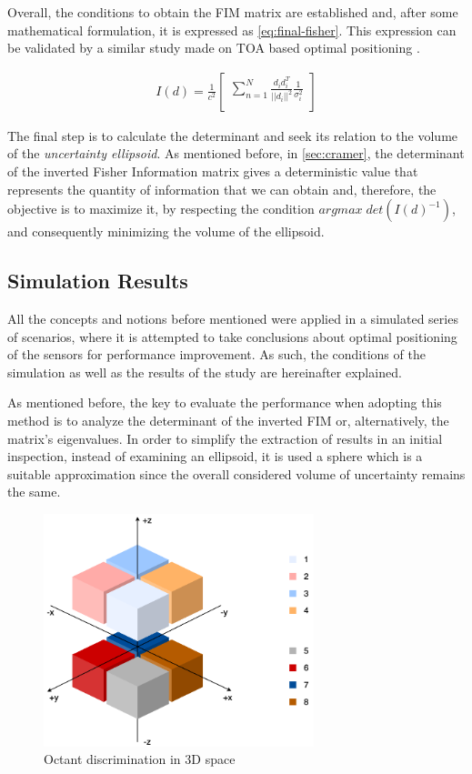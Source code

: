 Overall, the conditions to obtain the FIM matrix are established and, after some mathematical formulation, it is expressed as \ref{eq:final-fisher}. This expression can be validated by a similar study made on TOA based optimal positioning \cite{cramer-bruno}.

\begin{eqnarray}
	I(d) = \frac{1}{c^2} 
	\begin{bmatrix}
	\sum_{n=1}^{N} \frac{d_i d_i^T}{||d_i||^2} \frac{1}{\sigma_i^2}\\
	\end{bmatrix}
	\label{eq:final-fisher}
\end{eqnarray}

The final step is to calculate the determinant and seek its relation to the volume of the \textit{uncertainty ellipsoid}. As mentioned before, in \ref{sec:cramer}, the determinant of the inverted Fisher Information matrix gives a deterministic value that represents the quantity of information that we can obtain and, therefore, the objective is to maximize it, by respecting the condition $argmax \; det(I(d)^{-1})$, and consequently minimizing the volume of the ellipsoid. 

\subsection{Simulation Results}

All the concepts and notions before mentioned were applied in a simulated series of scenarios, where it is attempted to take conclusions about optimal positioning of the sensors for performance improvement. As such, the conditions of the simulation as well as the results of the study are hereinafter explained.

As mentioned before, the key to evaluate the performance when adopting this method is to analyze the determinant of the inverted FIM or, alternatively, the matrix's eigenvalues. In order to simplify the extraction of results in an initial inspection, instead of examining an ellipsoid, it is used a sphere which is a suitable approximation since the overall considered volume of uncertainty remains the same. 

\begin{figure}[!htbp]
	\centering
	\includegraphics[width=0.7\textwidth]{figures/octant}
	\caption{Octant discrimination in 3D space}
	\label{fig:octant}
\end{figure}

